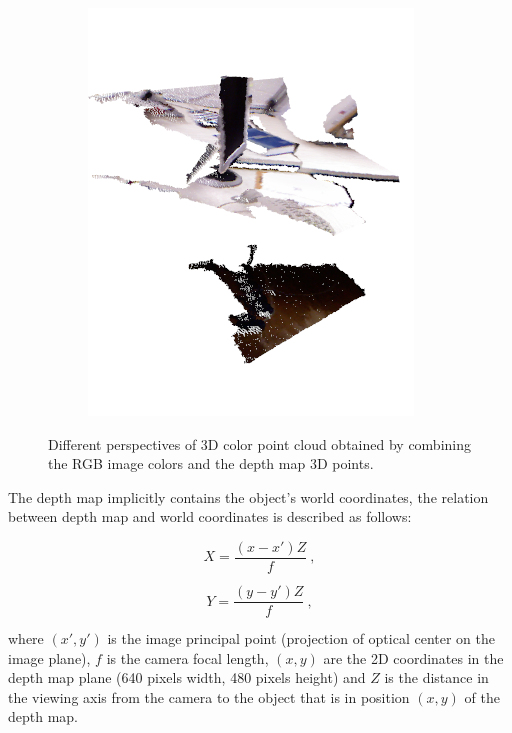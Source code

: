 \begin{figure}[H]
\begin{center}
\begin{subfigure}[b]{0.3\textwidth}
\includegraphics[scale=0.25]{images/3d_point_cloud3.png}
\caption{}
\end{subfigure}
\caption{Different perspectives of 3D color point cloud obtained by combining the RGB image colors and the depth map 3D points.}
\label{fig:colorpcloud}
\end{center}
\end{figure}


The depth map implicitly contains the object's world coordinates, the relation between depth map 
and world coordinates is described as follows:

\begin{equation}
\label{eq:depthmapx}
 X=\frac{(x-x')Z}{f}\ ,
\end{equation}

\begin{equation}
\label{eq:depthmapy}
 Y=\frac{(y-y')Z}{f}\ ,
\end{equation}


\noindent where $(x',y')$ is the image principal point (projection of optical center on the image plane), $f$ is the camera 
focal length, $(x,y)$ are the 2D coordinates in the depth map plane (640 pixels width, 480 pixels height) and $Z$ is the distance in the viewing axis from the camera to the object that is in position $(x,y)$ of the depth map.

